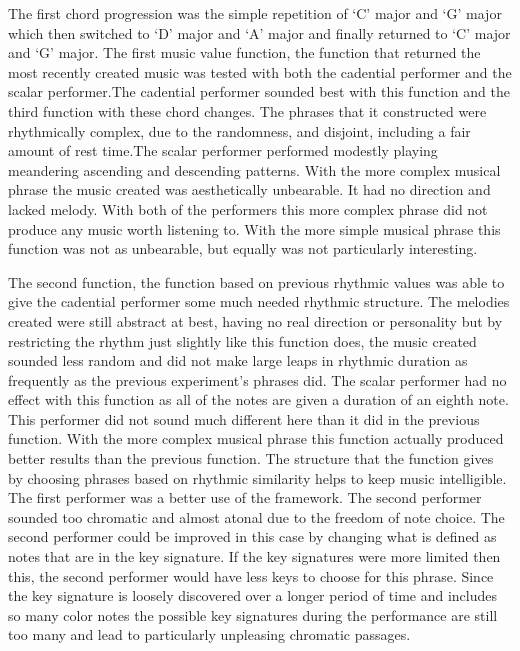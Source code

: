 \documentclass[12pt]{ucthesis}
\begin{document}
The first chord progression was the simple repetition of `C' major and `G' major which then switched to `D' major and `A' major and finally returned to `C' major and `G' major. The first music value function, the function that returned the most recently created music was tested with both the cadential performer and the scalar performer.The cadential performer sounded best with this function and the third function with these chord changes. The phrases that it constructed were rhythmically complex, due to the randomness, and disjoint, including a fair amount of rest time.The scalar performer performed modestly playing meandering ascending and descending patterns. With the more complex musical phrase the music created was aesthetically unbearable. It had no direction and lacked melody. With both of the performers this more complex phrase did not produce any music worth listening to. With the more simple musical phrase this function was not as unbearable, but equally was not particularly interesting.

The second function, the function based on previous rhythmic values was able to give the cadential performer some much needed rhythmic structure. The melodies created were still abstract at best, having no real direction or personality but by restricting the rhythm just slightly like this function does, the music created sounded less random and did not make large leaps in rhythmic duration as frequently as the previous experiment's phrases did. The scalar performer had no effect with this function as all of the notes are given a duration of an eighth note. This performer did not sound much different here than it did in the previous function. With the more complex musical phrase this function actually produced better results than the previous function. The structure that the function gives by choosing phrases based on rhythmic similarity helps to keep music intelligible. The first performer was a better use of the framework. The second performer sounded too chromatic and almost atonal due to the freedom of note choice. The second performer could be improved in this case by changing what is defined as notes that are in the key signature. If the key signatures were more limited then this, the second performer would have less keys to choose for this phrase. Since the key signature is loosely discovered over a longer period of time and includes so many color notes the possible key signatures during the performance are still too many and lead to particularly unpleasing chromatic passages.
\end{document}
